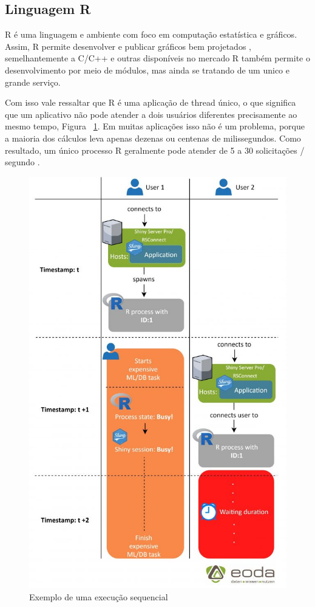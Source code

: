 \documentclass[12pt,english,brazil]{article}
\begin{document}
\subsection{Linguagem R} \label{sec:R}

R é uma linguagem e ambiente com foco em computação estatística e gráficos. Assim, R permite desenvolver e publicar gráficos bem projetados \cite{whatR}, semelhantemente a C/C++ e outras disponíveis no mercado R também permite o desenvolvimento por meio de módulos, mas ainda se tratando de um unico e grande serviço.

Com isso vale ressaltar que R é uma aplicação de thread único, o que significa que um aplicativo não pode atender a dois usuários diferentes precisamente ao mesmo tempo, Figura ~\ref{singleThreads}. Em muitas aplicações isso não é um problema, porque a maioria dos cálculos leva apenas dezenas ou centenas de milissegundos. Como resultado, um único processo R geralmente pode atender de 5 a 30 solicitações / segundo \cite{ShinyappsEscalabilidade}. 

\begin{figure}[htbp]
  \centering 
  \includegraphics[scale=.5]{figures/single_threads.jpg}
  \caption{Exemplo de uma execução sequencial \cite{singleThreads}}
  \label{singleThreads}
\end{figure}
\end{document}
